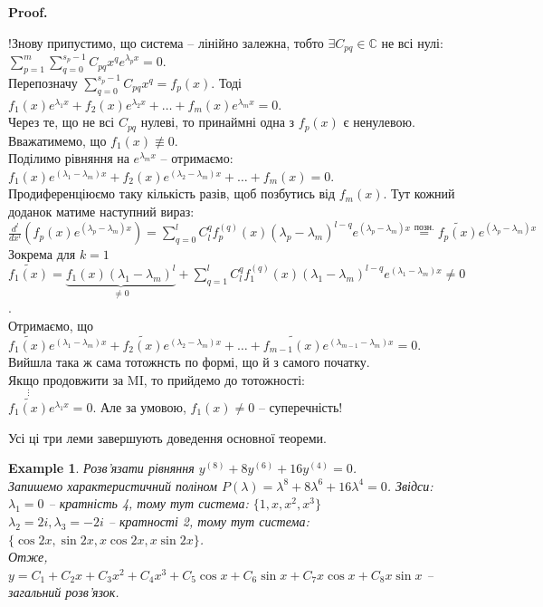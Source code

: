 \documentclass[a4paper, 10pt]{article}
\makeatletter
\def\qed{$\blacksquare$}
\theoremstyle{theoremdd}
\theoremstyle{theoremdd}
\theoremstyle{theoremdd}
\theoremstyle{theoremdd}
\newtheorem{example}[theorem]{Example}
\theoremstyle{theoremdd}
\theoremstyle{theoremdd}
\theoremstyle{theoremdd}
\theoremstyle{theoremdd}
\renewenvironment{proof}[1][Proof.\\]{\par
\pushQED{\hfill \qed}%
\normalfont \topsep6\p@\@plus6\p@\relax
\trivlist
\item\relax
{\bfseries
#1\@addpunct{.}}\hspace\labelsep\ignorespaces
}{%
\popQED\endtrivlist\@endpefalse
}
\makeatother
\begin{document}
\begin{proof}
!Знову припустимо, що система -- лінійно залежна, тобто $\exists C_{pq} \in \mathbb{C}$ не всі нулі: $\displaystyle \sum_{p=1}^m \sum_{q=0}^{s_p-1} C_{pq}x^qe^{\lambda_p x} = 0$.\\
Перепозначу $\displaystyle \sum_{q=0}^{s_p - 1} C_{pq}x^q = f_p(x)$. Тоді\\
$f_1(x)e^{\lambda_1 x} + f_2(x)e^{\lambda_2 x} + \dots + f_m(x)e^{\lambda_m x} = 0$.\\
Через те, що не всі $C_{pq}$ нулеві, то принаймні одна з $f_p(x)$ є ненулевою. Вважатимемо, що $f_1(x) \not\equiv 0$.\\
Поділимо рівняння на $e^{\lambda_m x}$ -- отримаємо:\\
$f_1(x)e^{(\lambda_1-\lambda_m) x} + f_2(x)e^{(\lambda_2-\lambda_m) x} + \dots + f_m(x) = 0$.\\
Продиференціюємо таку кількість разів, щоб позбутись від $f_m(x)$.
Тут кожний доданок матиме наступний вираз:\\
$\displaystyle \frac{d^l}{dx^l} \left(f_p(x)e^{(\lambda_p - \lambda_m)x} \right) = \sum_{q=0}^l C_l^q f_p^{(q)}(x)(\lambda_p - \lambda_m)^{l-q}e^{(\lambda_p - \lambda_m)x} \overset{\text{позн.}}{=} \tilde{f_p(x)}e^{(\lambda_p - \lambda_m)x}$\\
Зокрема для $k=1$ \\
$\displaystyle \tilde{f_1(x)} = \underbrace{f_1(x)(\lambda_1 - \lambda_m)^l}_{\neq 0} + \sum_{q=1}^l C_l^q f_1^{(q)}(x)(\lambda_1 - \lambda_m)^{l-q}e^{(\lambda_1 - \lambda_m)x} \neq 0$.\\
Отримаємо, що $\tilde{f_1(x)}e^{(\lambda_1 - \lambda_m)x} + \tilde{f_2(x)}e^{(\lambda_2 - \lambda_m)x} + \dots + \tilde{f_{m-1}(x)}e^{(\lambda_{m-1} - \lambda_m)x} = 0$.\\
Вийшла така ж сама тотожнсть по формі, що й з самого початку.\\
Якщо продовжити за MI, то прийдемо до тотожності:\\
$\overset{\vdots}{\tilde{f_1(x)}}e^{\lambda_1 x} = 0$.
Але за умовою, $f_1(x) \neq 0$ -- суперечність!
\end{proof}

Усі ці три леми завершують доведення основної теореми.

\begin{example}
Розв'язати рівняння $y^{(8)}+8y^{(6)}+16y^{(4)} = 0$.\\
Запишемо характеристичний поліном $P(\lambda) = \lambda^8 + 8 \lambda^6 + 16 \lambda^4 = 0$. Звідси:\\
$\lambda_1 = 0$ -- кратність 4, тому тут система: $\{1, x, x^2, x^3\}$\\
$\lambda_2 = 2i, \lambda_3 = -2i$ -- кратності 2, тому тут система: $\{\cos 2x, \sin 2x, x \cos 2x, x \sin 2x \}$.\\
Отже, $y = C_1 + C_2 x + C_3 x^2 + C_4 x^3 + C_5 \cos x + C_6 \sin x + C_7 x \cos x + C_8 x \sin x$ -- загальний розв'язок.
\end{example}
\end{document}
